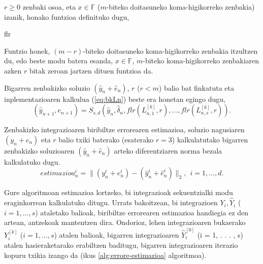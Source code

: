 $r\geqslant0$ zenbaki osoa, eta $x \in \mathbb{F}$ ($m$-biteko doitasuneko koma-higikorreko zenbakia) izanik, honako funtzioa definituko dugu,

\begin{algorithm}[H]
  \SetAlgoLined\DontPrintSemicolon
  \caption{flr}
\end{algorithm} 

Funtzio honek, $(m-r)$-biteko doitasuneko koma-higikorreko zenbakia itzultzen du, edo beste modu batera esanda, $x \in \mathbb{F}$, $m$-biteko koma-higikorreko zenbakiaren azken $r$ bitak zeroan jartzen dituen funtzioa da.

Bigarren zenbakizko soluzio $(\hat{y}_n+\hat{e}_{n})$, $r$ ($r<m$) balio bat finkatuta eta inplementazioaren kalkulua (\ref{eq:bkLn}) beste era honetan egingo dugu,
\begin{equation*}
\label{eq:bkLn2}
(\hat y_{n+1}, e_{n+1}) = S_{s,d}(\hat y_n, \hat{\delta}_n, flr(L_{n,1}^{[k]},r), \dots,flr(L_{n,s}^{[k]},r)).
\end{equation*}

Zenbakizko integrazioaren biribiltze errorearen estimazioa, soluzio nagusiaren $(y_n+e_{n})$ eta $r$  balio txiki baterako (esaterako $r=3$) kalkulatutako bigarren zenbakizko soluzioaren $(\hat{y}_n+\hat{e}_{n})$ arteko diferentziaren norma bezala kalkulatuko dugu. 
\begin{equation}
estimazioa_n^i=\|(y_n^i+e_n^i)-(\hat{y}_n^i+\hat{e}_{n}^i)\|_2, \ \ i=1,\dots,d.
\end{equation}

Gure algoritmoan estimazioa lortzeko, bi integrazioak sekuentzialki modu eraginkorrean kalkulatuko ditugu. Urrats bakoitzean, bi integrazioen $Y_i,\hat{Y}_i$ ($i=1,\dots,s$) ataletako balioak, biribiltze errorearen estimazioa handiegia ez den artean, antzekoak mantentzen dira. Ondorioz, lehen integrazioaren bukaerako $Y_i^{[k]}$ ($i=1,\dots,s$) atalen balioak, bigarren integrazioaren $\hat{Y}_i^{[0]}$ (i = 1, . . . , s) atalen hasieraketarako erabiltzen baditugu, bigarren integrazioaren iterazio kopuru txikia izango da (ikus \ref{alg:errore-estimazioa} algoritmoa).  

